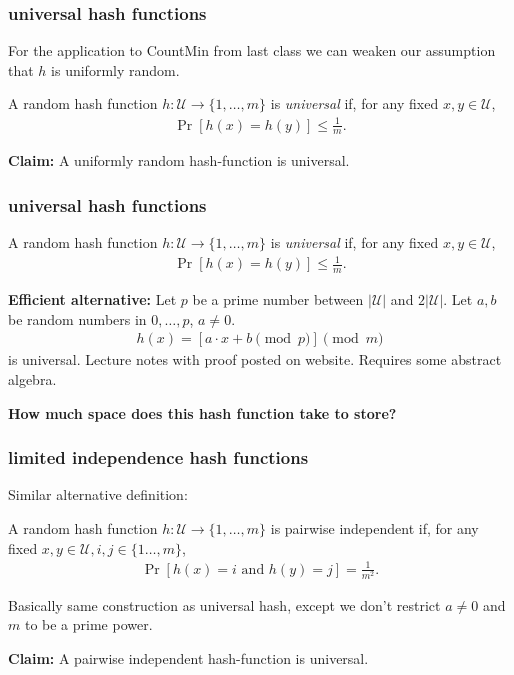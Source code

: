 \documentclass[handout,compress]{beamer}
\begin{document}
	\begin{frame}[t]
	\frametitle{universal hash functions}
	For the application to CountMin from last class we can weaken our assumption that $h$ is uniformly random.
	\begin{definition}
		A random hash function $h: \mathcal{U} \rightarrow \{1, \ldots, m\}$ is \emph{universal} if, for any fixed $x,y\in \mathcal{U}$,
		\begin{align*}
			\Pr[h(x) = h(y)] \leq \frac{1}{m}.
		\end{align*}
	\end{definition}
	\textbf{Claim:} A uniformly random hash-function is universal. 

\end{frame}

	\begin{frame}
		\frametitle{universal hash functions}
		\begin{definition}
		A random hash function $h: \mathcal{U} \rightarrow \{1, \ldots, m\}$ is \emph{universal} if, for any fixed $x,y\in \mathcal{U}$,\vspace{-1.5em}
		\begin{align*}
			\Pr[h(x) = h(y)] \leq \frac{1}{m}.
		\end{align*}
	\end{definition}
	\textbf{Efficient alternative:} Let $p$ be a prime number between $|\mathcal{U}|$ and $2|\mathcal{U}|$. Let $a,b$ be random numbers in $0,\ldots, p$, $a\neq 0$.
	\begin{align*}
		h(x) = \left[a\cdot x + b \pmod{p}\right] \pmod{m}
	\end{align*} 
	is universal. Lecture notes with proof posted on website. Requires some abstract algebra.
	
	\begin{center}
	\textbf{How much space does this hash function take to store?}
	\end{center}
\end{frame}

\begin{frame}[t]
	\frametitle{limited independence hash functions}
Similar alternative definition:
	\begin{definition}
		A random hash function $h: \mathcal{U} \rightarrow \{1, \ldots, m\}$ is pairwise independent if, for any fixed $x,y\in \mathcal{U}, i,j \in \{1\ldots, m\}$,
		\begin{align*}
			\Pr[h(x) = i \text{ and } h(y) = j] = \frac{1}{m^2}.
		\end{align*}
	\end{definition}
Basically same construction as universal hash, except we don't restrict $a \neq 0$ and $m$ to be a prime power.

\textbf{Claim:} A pairwise independent hash-function is universal. 

\end{frame}
\end{document}
